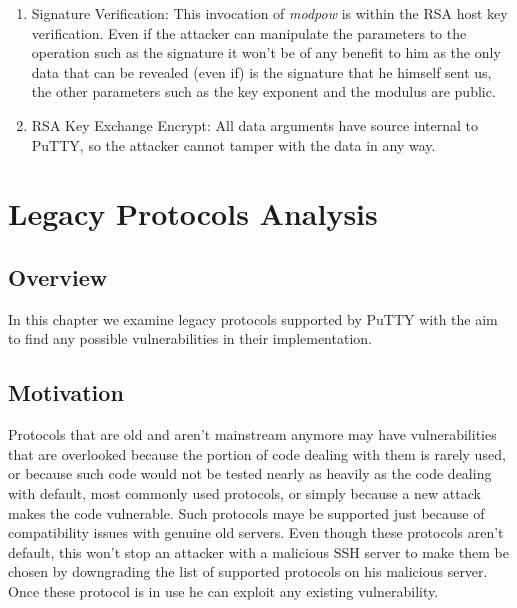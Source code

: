 \documentclass{report}
\begin{document}
\begin{enumerate}
\begin{enumerate}
            \item{Signature Verification}: This invocation of \textit{modpow} is within the RSA host key verification. Even if the attacker can manipulate the parameters to the operation such as the signature it won't be of any benefit to him as the only data that can be revealed (even if) is the signature that he himself sent us, the other parameters such as the key exponent and the modulus are public.
            \item{RSA Key Exchange Encrypt}: All data arguments have source internal to PuTTY, so the attacker cannot tamper with the data in any way.
         \end{enumerate}   
\end{enumerate}    
\chapter{Legacy Protocols Analysis}
\section{Overview}
In this chapter we examine legacy protocols supported by PuTTY with the aim to find any possible vulnerabilities in their implementation.
\section{Motivation}
Protocols that are old and aren't mainstream anymore may have vulnerabilities that are overlooked because the portion of code dealing with them is rarely used, or because such code would not be tested nearly as heavily as the code dealing with default, most commonly used protocols, or simply because a new attack makes the code vulnerable. Such protocols maye be supported just because of compatibility issues with genuine old servers. Even though these protocols aren't default, this won't stop an attacker with a malicious SSH server to make them be chosen by downgrading the list of supported protocols on his malicious server. Once these protocol is in use he can exploit any existing vulnerability.
\clearpage
\end{document}
